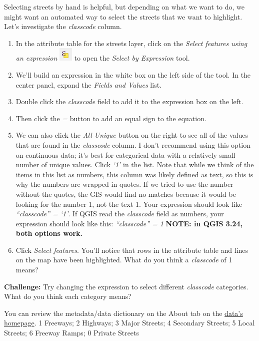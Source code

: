 \documentclass[
]{article}
\providecommand{\tightlist}{%
  \setlength{\itemsep}{0pt}\setlength{\parskip}{0pt}}
\begin{document}
Selecting streets by hand is helpful, but depending on what we want to do, we might want an automated way to select the streets that we want to highlight. Let's investigate the \emph{classcode} column.

\begin{enumerate}
\def\labelenumi{\arabic{enumi}.}
\tightlist
\item
  In the attribute table for the streets layer, click on the \emph{Select features using an expression} \includegraphics{./images/Tool_SelectFeaturesUsingExpression.png} to open the \emph{Select by Expression} tool.
\item
  We'll build an expression in the white box on the left side of the tool. In the center panel, expand the \emph{Fields and Values} list.
\item
  Double click the \emph{classcode} field to add it to the expression box on the left.\\
\item
  Then click the \emph{=} button to add an equal sign to the equation.
\item
  We can also click the \emph{All Unique} button on the right to see all of the values that are found in the \emph{classcode} column. I don't recommend using this option on continuous data; it's best for categorical data with a relatively small number of unique values. Click \emph{`1'} in the list. Note that while we think of the items in this list as numbers, this column was likely defined as text, so this is why the numbers are wrapped in quotes. If we tried to use the number without the quotes, the GIS would find no matches because it would be looking for the number 1, not the text 1. Your expression should look like \emph{``classcode'' = `1'}. If QGIS read the \emph{classcode} field as numbers, your expression should look like this: \emph{``classcode'' = 1} \textbf{NOTE: in QGIS 3.24, both options work.}
\item
  Click \emph{Select features}. You'll notice that rows in the attribute table and lines on the map have been highlighted. What do you think a \emph{classcode} of 1 means?
\end{enumerate}

\textbf{Challenge:} Try changing the expression to select different \emph{classcode} categories. What do you think each category means?

You can review the metadata/data dictionary on the About tab on the \href{https://data.sfgov.org/Geographic-Locations-and-Boundaries/San-Francisco-Basemap-Street-Centerlines}{data's homepage}. 1 Freeways; 2 Highways; 3 Major Streets; 4 Secondary Streets; 5 Local Streets; 6 Freeway Ramps; 0 Private Streets
\end{document}
